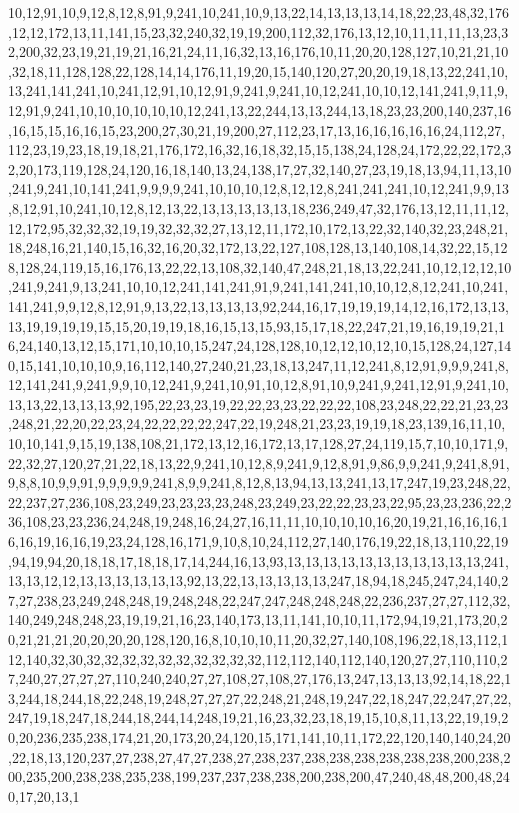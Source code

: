 10,12,91,10,9,12,8,12,8,91,9,241,10,241,10,9,13,22,14,13,13,13,14,18,22,23,48,32,176,12,12,172,13,11,141,15,23,32,240,32,19,19,200,112,32,176,13,12,10,11,11,11,13,23,32,200,32,23,19,21,19,21,16,21,24,11,16,32,13,16,176,10,11,20,20,128,127,10,21,21,10,32,18,11,128,128,22,128,14,14,176,11,19,20,15,140,120,27,20,20,19,18,13,22,241,10,13,241,141,241,10,241,12,91,10,12,91,9,241,9,241,10,12,241,10,10,12,141,241,9,11,9,12,91,9,241,10,10,10,10,10,10,12,241,13,22,244,13,13,244,13,18,23,23,200,140,237,16,16,15,15,16,16,15,23,200,27,30,21,19,200,27,112,23,17,13,16,16,16,16,16,24,112,27,112,23,19,23,18,19,18,21,176,172,16,32,16,18,32,15,15,138,24,128,24,172,22,22,172,32,20,173,119,128,24,120,16,18,140,13,24,138,17,27,32,140,27,23,19,18,13,94,11,13,10,241,9,241,10,141,241,9,9,9,9,241,10,10,10,12,8,12,12,8,241,241,241,10,12,241,9,9,13,8,12,91,10,241,10,12,8,12,13,22,13,13,13,13,13,18,236,249,47,32,176,13,12,11,11,12,12,172,95,32,32,32,19,19,32,32,32,27,13,12,11,172,10,172,13,22,32,140,32,23,248,21,18,248,16,21,140,15,16,32,16,20,32,172,13,22,127,108,128,13,140,108,14,32,22,15,128,128,24,119,15,16,176,13,22,22,13,108,32,140,47,248,21,18,13,22,241,10,12,12,12,10,241,9,241,9,13,241,10,10,12,241,141,241,91,9,241,141,241,10,10,12,8,12,241,10,241,141,241,9,9,12,8,12,91,9,13,22,13,13,13,13,92,244,16,17,19,19,19,14,12,16,172,13,13,13,19,19,19,19,15,15,20,19,19,18,16,15,13,15,93,15,17,18,22,247,21,19,16,19,19,21,16,24,140,13,12,15,171,10,10,10,15,247,24,128,128,10,12,12,10,12,10,15,128,24,127,140,15,141,10,10,10,9,16,112,140,27,240,21,23,18,13,247,11,12,241,8,12,91,9,9,9,241,8,12,141,241,9,241,9,9,10,12,241,9,241,10,91,10,12,8,91,10,9,241,9,241,12,91,9,241,10,13,13,22,13,13,13,92,195,22,23,23,19,22,22,23,23,22,22,22,108,23,248,22,22,21,23,23,248,21,22,20,22,23,24,22,22,22,22,247,22,19,248,21,23,23,19,19,18,23,139,16,11,10,10,10,141,9,15,19,138,108,21,172,13,12,16,172,13,17,128,27,24,119,15,7,10,10,171,9,22,32,27,120,27,21,22,18,13,22,9,241,10,12,8,9,241,9,12,8,91,9,86,9,9,241,9,241,8,91,9,8,8,10,9,9,91,9,9,9,9,9,241,8,9,9,241,8,12,8,13,94,13,13,241,13,17,247,19,23,248,22,22,237,27,236,108,23,249,23,23,23,23,248,23,249,23,22,22,23,23,22,95,23,23,236,22,236,108,23,23,236,24,248,19,248,16,24,27,16,11,11,10,10,10,10,16,20,19,21,16,16,16,16,16,19,16,16,19,23,24,128,16,171,9,10,8,10,24,112,27,140,176,19,22,18,13,110,22,19,94,19,94,20,18,18,17,18,18,17,14,244,16,13,93,13,13,13,13,13,13,13,13,13,13,13,241,13,13,12,12,13,13,13,13,13,13,92,13,22,13,13,13,13,13,247,18,94,18,245,247,24,140,27,27,238,23,249,248,248,19,248,248,22,247,247,248,248,248,22,236,237,27,27,112,32,140,249,248,248,23,19,19,21,16,23,140,173,13,11,141,10,10,11,172,94,19,21,173,20,20,21,21,21,20,20,20,20,128,120,16,8,10,10,10,11,20,32,27,140,108,196,22,18,13,112,112,140,32,30,32,32,32,32,32,32,32,32,32,32,112,112,140,112,140,120,27,27,110,110,27,240,27,27,27,27,110,240,240,27,27,108,27,108,27,176,13,247,13,13,13,92,14,18,22,13,244,18,244,18,22,248,19,248,27,27,27,22,248,21,248,19,247,22,18,247,22,247,27,22,247,19,18,247,18,244,18,244,14,248,19,21,16,23,32,23,18,19,15,10,8,11,13,22,19,19,20,20,236,235,238,174,21,20,173,20,24,120,15,171,141,10,11,172,22,120,140,140,24,20,22,18,13,120,237,27,238,27,47,27,238,27,238,237,238,238,238,238,238,238,200,238,200,235,200,238,238,235,238,199,237,237,238,238,200,238,200,47,240,48,48,200,48,240,17,20,13,1